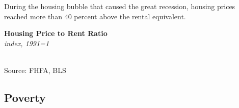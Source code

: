 \documentclass{report}
\makeatletter
\newcommand{\tbllink}[1]{\href{https://raw.githubusercontent.com/bdecon/US-chartbook/master/chartbook/data/#1}{\faTable}}
\newcommand*\short[1]{\expandafter\@gobbletwo\number\numexpr#1\relax}
\newcommand{\shdateaxisticks}{
		date coordinates in=x, axis line style={draw=none},
		xmax={2022-10-31},
		max space between ticks=40,	    
		xtick={{1990-01-01}, {1995-01-01}, {2000-01-01}, 
			{2005-01-01}, {2010-01-01}, {2015-01-01}, {2020-01-01}},
		minor xtick={},
		enlarge y limits={0.06}, enlarge x limits={0.01},
		}
\newcommand{\bbar}[2]{extra #1 ticks = {{#2}}, extra #1 tick labels = ,
		extra #1 tick style = {grid=major, grid style={thick, black!25}},}
\newcommand{\stdline}[4]{\addplot[very thick, no markers, color=#1] 
		table [x=#2, y=#3, col sep=comma] {#4};	}
\newcommand{\rebars}{
		\fill[color=black!10] (axis cs:{2007-12-01},\pgfkeysvalueof{/pgfplots/ymin}) rectangle 
			(axis cs:{2009-07-01}, \pgfkeysvalueof{/pgfplots/ymax});
		\fill[color=black!10] (axis cs:{2001-03-01},\pgfkeysvalueof{/pgfplots/ymin}) rectangle 
			(axis cs:{2001-11-01}, \pgfkeysvalueof{/pgfplots/ymax});
		\fill[color=black!10] (axis cs:{2020-02-01},\pgfkeysvalueof{/pgfplots/ymin}) rectangle 
			(axis cs:{2020-05-01}, \pgfkeysvalueof{/pgfplots/ymax});}
\makeatother
\begin{document}
{\begin{minipage}{0.33\textwidth}
During the housing bubble that caused the great recession, housing prices reached more than 40 percent above the rental equivalent. 
\end{minipage}\hspace{8mm}
\begin{minipage}{0.37\textwidth}
\normalsize \textbf{Housing Price to Rent Ratio}\\
\footnotesize{\textit{index, 1991=1}}\\
\hspace*{-2mm} \\
\footnotesize{Source: FHFA, BLS} \hfill \tbllink{hpi_rent_ratio.csv} 
\end{minipage}
\newpage
\begin{minipage}{0.76\textwidth}
\subsection*{Poverty}
\hypertarget{hhpov}{}
\small 


\end{minipage}}
\end{document}
